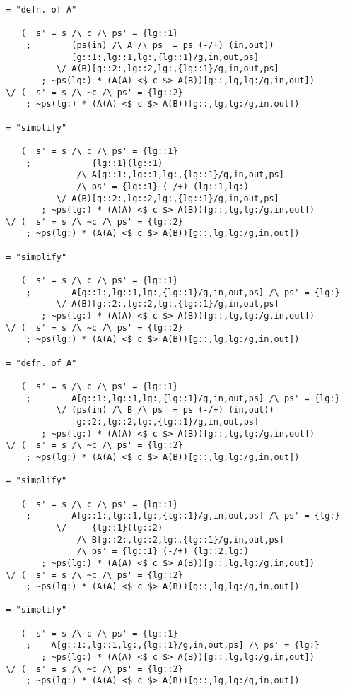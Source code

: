 \begin{verbatim}
 = "defn. of A"

    (  s' = s /\ c /\ ps' = {lg::1}
     ;        (ps(in) /\ A /\ ps' = ps (-/+) (in,out))
              [g::1:,lg::1,lg:,{lg::1}/g,in,out,ps]
           \/ A(B)[g::2:,lg::2,lg:,{lg::1}/g,in,out,ps]
        ; ~ps(lg:) * (A(A) <$ c $> A(B))[g::,lg,lg:/g,in,out])
 \/ (  s' = s /\ ~c /\ ps' = {lg::2}
     ; ~ps(lg:) * (A(A) <$ c $> A(B))[g::,lg,lg:/g,in,out])

 = "simplify"

    (  s' = s /\ c /\ ps' = {lg::1}
     ;            {lg::1}(lg::1)
               /\ A[g::1:,lg::1,lg:,{lg::1}/g,in,out,ps]
               /\ ps' = {lg::1} (-/+) (lg::1,lg:)
           \/ A(B)[g::2:,lg::2,lg:,{lg::1}/g,in,out,ps]
        ; ~ps(lg:) * (A(A) <$ c $> A(B))[g::,lg,lg:/g,in,out])
 \/ (  s' = s /\ ~c /\ ps' = {lg::2}
     ; ~ps(lg:) * (A(A) <$ c $> A(B))[g::,lg,lg:/g,in,out])

 = "simplify"

    (  s' = s /\ c /\ ps' = {lg::1}
     ;        A[g::1:,lg::1,lg:,{lg::1}/g,in,out,ps] /\ ps' = {lg:}
           \/ A(B)[g::2:,lg::2,lg:,{lg::1}/g,in,out,ps]
        ; ~ps(lg:) * (A(A) <$ c $> A(B))[g::,lg,lg:/g,in,out])
 \/ (  s' = s /\ ~c /\ ps' = {lg::2}
     ; ~ps(lg:) * (A(A) <$ c $> A(B))[g::,lg,lg:/g,in,out])

 = "defn. of A"

    (  s' = s /\ c /\ ps' = {lg::1}
     ;        A[g::1:,lg::1,lg:,{lg::1}/g,in,out,ps] /\ ps' = {lg:}
           \/ (ps(in) /\ B /\ ps' = ps (-/+) (in,out))
              [g::2:,lg::2,lg:,{lg::1}/g,in,out,ps]
        ; ~ps(lg:) * (A(A) <$ c $> A(B))[g::,lg,lg:/g,in,out])
 \/ (  s' = s /\ ~c /\ ps' = {lg::2}
     ; ~ps(lg:) * (A(A) <$ c $> A(B))[g::,lg,lg:/g,in,out])

 = "simplify"

    (  s' = s /\ c /\ ps' = {lg::1}
     ;        A[g::1:,lg::1,lg:,{lg::1}/g,in,out,ps] /\ ps' = {lg:}
           \/     {lg::1}(lg::2)
               /\ B[g::2:,lg::2,lg:,{lg::1}/g,in,out,ps]
               /\ ps' = {lg::1} (-/+) (lg::2,lg:)
        ; ~ps(lg:) * (A(A) <$ c $> A(B))[g::,lg,lg:/g,in,out])
 \/ (  s' = s /\ ~c /\ ps' = {lg::2}
     ; ~ps(lg:) * (A(A) <$ c $> A(B))[g::,lg,lg:/g,in,out])

 = "simplify"

    (  s' = s /\ c /\ ps' = {lg::1}
     ;    A[g::1:,lg::1,lg:,{lg::1}/g,in,out,ps] /\ ps' = {lg:}
        ; ~ps(lg:) * (A(A) <$ c $> A(B))[g::,lg,lg:/g,in,out])
 \/ (  s' = s /\ ~c /\ ps' = {lg::2}
     ; ~ps(lg:) * (A(A) <$ c $> A(B))[g::,lg,lg:/g,in,out])


\end{verbatim}
